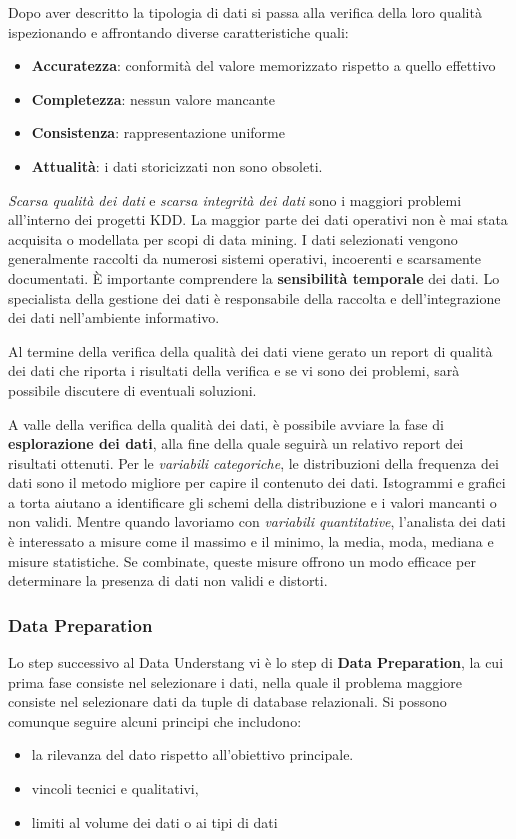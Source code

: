 \documentclass[a4paper]{extarticle}
\begin{document}
Dopo aver descritto la tipologia di dati si passa alla verifica della loro qualità ispezionando e affrontando diverse caratteristiche quali:

\begin{itemize}
\item \textbf{Accuratezza}: conformità del valore memorizzato rispetto a quello effettivo
\item \textbf{Completezza}: nessun valore mancante
\item \textbf{Consistenza}: rappresentazione uniforme
\item \textbf{Attualità}: i dati storicizzati non sono obsoleti.
\end{itemize}

\textit{Scarsa qualità dei dati} e \textit{scarsa integrità dei dati} sono i maggiori problemi all'interno dei progetti KDD. La maggior parte dei dati operativi non è mai stata acquisita o modellata per scopi di data mining. I dati selezionati vengono generalmente raccolti da numerosi sistemi operativi, incoerenti e scarsamente documentati. È importante comprendere la \textbf{sensibilità temporale} dei dati. Lo specialista della gestione dei dati è responsabile della raccolta e dell'integrazione dei dati nell'ambiente informativo. 

Al termine della verifica della qualità dei dati viene gerato un report di qualità dei dati che riporta i risultati della verifica e se vi sono dei problemi, sarà possibile discutere di eventuali soluzioni.

A valle della verifica della qualità dei dati, è possibile avviare la fase di \textbf{esplorazione dei dati}, alla fine della quale seguirà un relativo report dei risultati ottenuti. Per le \textit{variabili categoriche}, le distribuzioni della frequenza dei dati sono il metodo migliore per capire il contenuto dei dati. Istogrammi e grafici a torta aiutano a identificare gli schemi della distribuzione e i valori mancanti o non validi. Mentre quando lavoriamo con \textit{variabili quantitative}, l'analista dei dati è interessato a misure come il massimo e il minimo, la media, moda, mediana e misure statistiche. Se combinate, queste misure offrono un modo efficace per determinare la presenza di dati non validi e distorti.

\subsubsection{Data Preparation}

Lo step successivo al Data Understang vi è lo step di \textbf{Data Preparation}, la cui prima fase consiste nel selezionare i dati, nella quale il problema maggiore consiste nel selezionare dati da tuple di database relazionali. Si possono comunque seguire alcuni principi che includono:
\begin{itemize}
\item la rilevanza del dato rispetto all'obiettivo principale.
\item vincoli tecnici e qualitativi,
\item limiti al volume dei dati o ai tipi di dati
\end{itemize}
\end{document}
